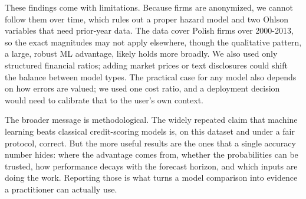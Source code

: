 \documentclass[12pt,a4paper]{article}
\begin{document}
These findings come with limitations. Because firms are anonymized, we cannot
follow them over time, which rules out a proper hazard model and two Ohlson
variables that need prior-year data. The data cover Polish firms over
2000-2013, so the exact magnitudes may not apply elsewhere, though the
qualitative pattern, a large, robust ML advantage, likely holds more
broadly. We also used only structured financial ratios; adding market prices
or text disclosures could shift the balance between model types. The practical
case for any model also depends on how errors are valued; we used one
cost ratio, and a deployment decision would need to calibrate that
to the user's own context.

The broader message is methodological. The widely repeated claim that machine
learning beats classical credit-scoring models is, on this dataset and under a
fair protocol, correct. But the more useful results are the ones that a single
accuracy number hides: where the advantage comes from, whether the
probabilities can be trusted, how performance decays with the forecast horizon,
and which inputs are doing the work. Reporting those is what turns a model
comparison into evidence a practitioner can actually use.

\end{document}
